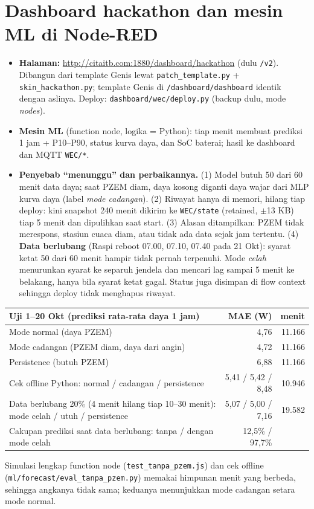\documentclass[10.5pt,a4paper]{article}
\newcommand{\cmd}[1]{\texttt{#1}}
\begin{document}
\section{Dashboard hackathon dan mesin ML di Node-RED}\label{sec:dash}
\begingroup\sloppy
\begin{itemize}
  \item \textbf{Halaman:} \url{http://citaitb.com:1880/dashboard/hackathon} (dulu \cmd{/v2}). Dibangun dari template Genis lewat \cmd{patch\_template.py} + \cmd{skin\_hackathon.py};
        template Genis di \cmd{/dashboard/dashboard} identik dengan aslinya. Deploy: \cmd{dashboard/wec/deploy.py} (backup dulu, mode \emph{nodes}).
  \item \textbf{Mesin ML} (function node, logika = Python): tiap menit membuat prediksi 1 jam + P10--P90, status kurva daya, dan SoC baterai; hasil ke dashboard dan MQTT \cmd{WEC/*}.
  \item \textbf{Penyebab ``menunggu'' dan perbaikannya.} (1) Model butuh 50 dari 60 menit data daya; saat PZEM diam, daya kosong diganti daya wajar dari MLP kurva daya
        (label \emph{mode cadangan}). (2) Riwayat hanya di memori, hilang tiap deploy: kini snapshot 240 menit dikirim ke \cmd{WEC/state} (retained, $\pm$13 KB) tiap 5 menit dan dipulihkan saat start.
        (3) Alasan ditampilkan: PZEM tidak merespons, stasiun cuaca diam, atau tidak ada data sejak jam tertentu.
        (4) \textbf{Data berlubang} (Raspi reboot 07.00, 07.10, 07.40 pada 21 Okt): syarat ketat 50 dari 60 menit hampir tidak pernah terpenuhi. Mode \emph{celah} menurunkan syarat ke separuh jendela dan mencari lag sampai 5 menit ke belakang, hanya bila syarat ketat gagal. Status juga disimpan di flow context sehingga deploy tidak menghapus riwayat.
\end{itemize}
\endgroup
\begin{center}
\small
\begin{tabularx}{0.8\linewidth}{@{}X r r@{}}
\toprule
Uji 1--20 Okt (prediksi rata-rata daya 1 jam) & MAE (W) & menit \\
\midrule
Mode normal (daya PZEM) & 4,76 & 11.166 \\
Mode cadangan (PZEM diam, daya dari angin) & 4,72 & 11.166 \\
Persistence (butuh PZEM) & 6,88 & 11.166 \\
\midrule
Cek offline Python: normal / cadangan / persistence & 5,41 / 5,42 / 8,48 & 10.946 \\
\midrule
Data berlubang 20\% (4 menit hilang tiap 10--30 menit): mode celah / utuh / persistence & 5,07 / 5,00 / 7,16 & 19.582 \\
Cakupan prediksi saat data berlubang: tanpa / dengan mode celah & 12,5\% / 97,7\% & \\
\bottomrule
\end{tabularx}
\end{center}
{\small Simulasi lengkap function node (\cmd{test\_tanpa\_pzem.js}) dan cek offline (\cmd{ml/forecast/eval\_tanpa\_pzem.py}) memakai himpunan menit yang berbeda, sehingga angkanya tidak sama; keduanya menunjukkan mode cadangan setara mode normal.}
\end{document}
